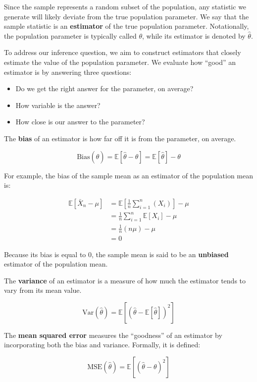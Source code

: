 \documentclass[
  letterpaper,
  DIV=11,
  numbers=noendperiod]{scrreprt}
\providecommand{\tightlist}{%
  \setlength{\itemsep}{0pt}\setlength{\parskip}{0pt}}\usepackage{longtable,booktabs,array}
\begin{document}
Since the sample represents a random subset of the population, any
statistic we generate will likely deviate from the true population
parameter. We say that the sample statistic is an \textbf{estimator} of
the true population parameter. Notationally, the population parameter is
typically called \(\theta\), while its estimator is denoted by
\(\hat{\theta}\).

To address our inference question, we aim to construct estimators that
closely estimate the value of the population parameter. We evaluate how
``good'' an estimator is by answering three questions:

\begin{itemize}
\tightlist
\item
  Do we get the right answer for the parameter, on average?
\item
  How variable is the answer?
\item
  How close is our answer to the parameter?
\end{itemize}

The \textbf{bias} of an estimator is how far off it is from the
parameter, on average.

\[\text{Bias}(\hat{\theta}) = \mathbb{E}[\hat{\theta} - \theta] = \mathbb{E}[\hat{\theta}] - \theta\]

For example, the bias of the sample mean as an estimator of the
population mean is:

\[\begin{align}\mathbb{E}[\bar{X}_n - \mu]
&= \mathbb{E}[\frac{1}{n}\sum_{i=1}^n (X_i)] - \mu \\
&= \frac{1}{n}\sum_{i=1}^n \mathbb{E}[X_i] - \mu \\
&= \frac{1}{n} (n\mu) - \mu \\
&= 0\end{align}\]

Because its bias is equal to 0, the sample mean is said to be an
\textbf{unbiased} estimator of the population mean.

The \textbf{variance} of an estimator is a measure of how much the
estimator tends to vary from its mean value.

\[\text{Var}(\hat{\theta}) = \mathbb{E}\left[(\hat{\theta} - \mathbb{E}[\hat{\theta}])^2 \right]\]

The \textbf{mean squared error} measures the ``goodness'' of an
estimator by incorporating both the bias and variance. Formally, it is
defined:

\[\text{MSE}(\hat{\theta}) = \mathbb{E}\left[(\hat{\theta} - \theta)^2
\right]\]
\end{document}
